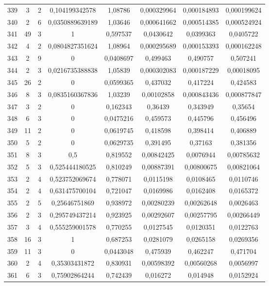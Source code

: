 \begin{longtable}{|c|c|c|c|c|c|c|c|}
339 & 3 & 2 & 0,104199342578 & 1,08786 & 0,000329964 & 0,000184893 & 0,000199624  \\
340 & 2 & 6 & 0,0350889639189 & 1,03646 & 0,000641662 & 0,000514385 & 0,000524924  \\
341 & 49 & 3 & 1 & 0,597537 & 0,0430642 & 0,0399363 & 0,0405722  \\
342 & 4 & 2 & 0,0804827351624 & 1,08964 & 0,000295689 & 0,000153393 & 0,000162248  \\
343 & 2 & 9 & 0 & 0,0408697 & 0,499463 & 0,490757 & 0,507241  \\
344 & 2 & 3 & 0,0216735388838 & 1,05839 & 0,000302083 & 0,000187229 & 0,00018095  \\
345 & 26 & 2 & 0 & 0,0599365 & 0,437032 & 0,417224 & 0,424583  \\
346 & 8 & 3 & 0,0835160367836 & 1,03239 & 0,00102858 & 0,000843436 & 0,000877847  \\
347 & 3 & 2 & 0 & 0,162343 & 0,36439 & 0,343949 & 0,35654  \\
348 & 6 & 3 & 0 & 0,0475216 & 0,459573 & 0,445796 & 0,456496  \\
349 & 11 & 2 & 0 & 0,0619745 & 0,418598 & 0,398414 & 0,406889  \\
350 & 5 & 2 & 0 & 0,0629735 & 0,391495 & 0,37163 & 0,381356  \\
351 & 8 & 3 & 0,5 & 0,819552 & 0,00842425 & 0,0076944 & 0,00785632  \\
352 & 5 & 3 & 0,525444180525 & 0,810249 & 0,00887391 & 0,00800675 & 0,00821064  \\
353 & 2 & 4 & 0,523752069674 & 0,778071 & 0,0115198 & 0,0108465 & 0,0110746  \\
354 & 2 & 4 & 0,631475700104 & 0,721047 & 0,0169986 & 0,0162408 & 0,0165372  \\
355 & 2 & 5 & 0,25646751869 & 0,938972 & 0,00280239 & 0,00262648 & 0,0026463  \\
356 & 2 & 3 & 0,295749437214 & 0,923925 & 0,00292607 & 0,00257795 & 0,00266449  \\
357 & 3 & 4 & 0,555259001578 & 0,770255 & 0,0127545 & 0,0120351 & 0,0122763  \\
358 & 16 & 3 & 1 & 0,687253 & 0,0281079 & 0,0265158 & 0,0269356  \\
359 & 11 & 3 & 0 & 0,0443048 & 0,475939 & 0,462247 & 0,471704  \\
360 & 2 & 4 & 0,35303431872 & 0,830931 & 0,00598392 & 0,00560268 & 0,0056997  \\
361 & 6 & 3 & 0,75902864244 & 0,742439 & 0,016272 & 0,014948 & 0,0152924  \\

\end{longtable}
